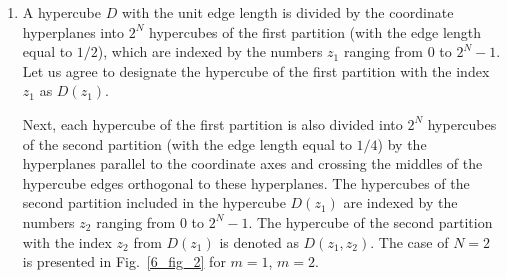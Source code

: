 \begin{enumerate}
	\item 
A hypercube $D$ with the unit edge length is divided by the coordinate hyperplanes into $2^N$ hypercubes of the first partition (with the edge length equal to $1/2$), which are indexed by the numbers $z_1$ ranging from $0$ to $2^N-1$. Let us agree to designate the hypercube of the first partition with the index $z_1$ as $D(z_1)$.

Next, each hypercube of the first partition is also divided into $2^N$ hypercubes of the second partition (with the edge length equal to $1/4$) by the hyperplanes parallel to the coordinate axes and crossing the middles of the hypercube edges orthogonal to these hyperplanes. The hypercubes of the second partition  included in the hypercube $D(z_1)$ are indexed by the numbers $z_2$ ranging from $0$ to $2^N-1$. The hypercube of the second partition  with the index $z_2$ from  $D(z_1)$ is denoted as $D(z_1, z_2)$. The case of $N=2$ is presented in Fig.~\ref{6_fig_2} for $m=1$, $m=2$.


\end{enumerate}
